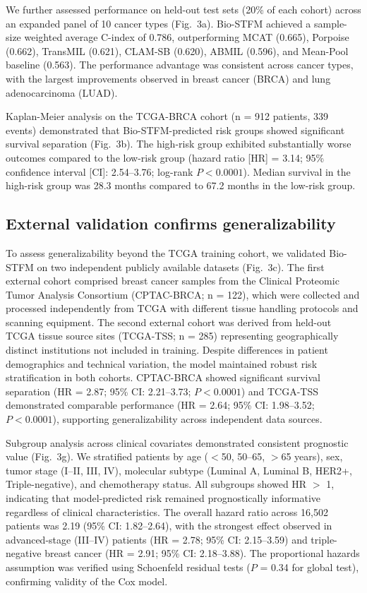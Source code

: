 \documentclass[pdflatex,sn-nature]{sn-jnl}%
\theoremstyle{thmstyleone}%
\theoremstyle{thmstyletwo}%
\theoremstyle{thmstylethree}%
\begin{document}
We further assessed performance on held-out test sets (20\% of each cohort) across an expanded panel of 10 cancer types (Fig.~3a). Bio-STFM achieved a sample-size weighted average C-index of 0.786, outperforming MCAT\cite{bib6} (0.665), Porpoise\cite{bib23} (0.662), TransMIL\cite{bib18} (0.621), CLAM-SB\cite{bib5} (0.620), ABMIL\cite{bib4} (0.596), and Mean-Pool baseline (0.563). The performance advantage was consistent across cancer types, with the largest improvements observed in breast cancer (BRCA) and lung adenocarcinoma (LUAD).

Kaplan-Meier analysis on the TCGA-BRCA cohort (n = 912 patients, 339 events) demonstrated that Bio-STFM-predicted risk groups showed significant survival separation (Fig.~3b). The high-risk group exhibited substantially worse outcomes compared to the low-risk group (hazard ratio [HR] = 3.14; 95\% confidence interval [CI]: 2.54--3.76; log-rank $P < 0.0001$). Median survival in the high-risk group was 28.3 months compared to 67.2 months in the low-risk group.

\subsection{External validation confirms generalizability}\label{subsec4}

To assess generalizability beyond the TCGA training cohort, we validated Bio-STFM on two independent publicly available datasets (Fig.~3c). The first external cohort comprised breast cancer samples from the Clinical Proteomic Tumor Analysis Consortium (CPTAC-BRCA; n = 122), which were collected and processed independently from TCGA with different tissue handling protocols and scanning equipment\cite{bibCPTAC}. The second external cohort was derived from held-out TCGA tissue source sites (TCGA-TSS; n = 285) representing geographically distinct institutions not included in training. Despite differences in patient demographics and technical variation, the model maintained robust risk stratification in both cohorts. CPTAC-BRCA showed significant survival separation (HR = 2.87; 95\% CI: 2.21--3.73; $P < 0.0001$) and TCGA-TSS demonstrated comparable performance (HR = 2.64; 95\% CI: 1.98--3.52; $P < 0.0001$), supporting generalizability across independent data sources.

Subgroup analysis across clinical covariates demonstrated consistent prognostic value (Fig.~3g). We stratified patients by age ($<$50, 50--65, $>$65 years), sex, tumor stage (I--II, III, IV), molecular subtype (Luminal A, Luminal B, HER2+, Triple-negative), and chemotherapy status. All subgroups showed HR $>$ 1, indicating that model-predicted risk remained prognostically informative regardless of clinical characteristics. The overall hazard ratio across 16,502 patients was 2.19 (95\% CI: 1.82--2.64), with the strongest effect observed in advanced-stage (III--IV) patients (HR = 2.78; 95\% CI: 2.15--3.59) and triple-negative breast cancer (HR = 2.91; 95\% CI: 2.18--3.88). The proportional hazards assumption was verified using Schoenfeld residual tests ($P$ = 0.34 for global test), confirming validity of the Cox model.
\end{document}
